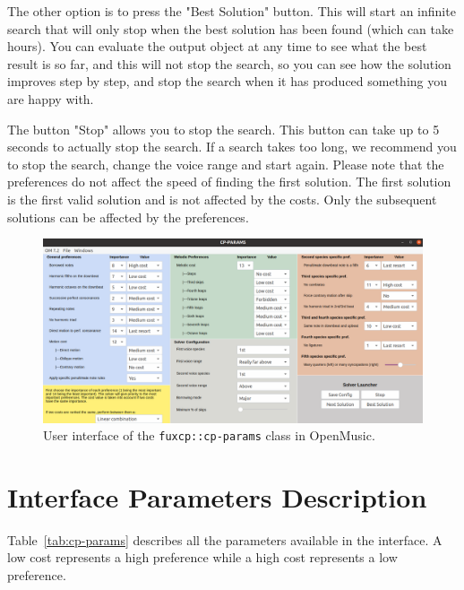The other option is to press the "Best Solution" button. This will start an infinite search that will only stop when the best solution has been found (which can take hours). You can evaluate the output object at any time to see what the best result is so far, and this will not stop the search, so you can see how the solution improves step by step, and stop the search when it has produced something you are happy with.

The button "Stop" allows you to stop the search. This button can take up to 5 seconds to actually stop the search. If a search takes too long, we recommend you to stop the search, change the voice range and start again.
Please note that the preferences do not affect the speed of finding the first solution. The first solution is the first valid solution and is not affected by the costs. Only the subsequent solutions can be affected by the preferences.

\begin{figure}
  \centering
  \includegraphics[width=\textheight, height=\textwidth, keepaspectratio]{Images/om_int_interface.png}
  \caption{User interface of the \texttt{fuxcp::cp-params} class in OpenMusic.}
  \label{fig:om_int_interface}
\end{figure}

\section{Interface Parameters Description} \label{appendix:interface-parameters-description}
Table~\ref{tab:cp-params} describes all the parameters available in the interface. A low cost represents a high preference while a high cost represents a low preference.

